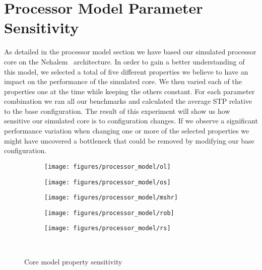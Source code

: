 
\section{Processor Model Parameter Sensitivity}
\label{sec:results:model_sensitivity}

As detailed in the processor model section we have based our simulated processor core on the Nehalem~\cite{Thomadakis2011} architecture.
In order to gain a better understanding of this model, we selected a total of five different properties we believe to have an impact on the performance of the simulated core.
We then varied each of the properties one at the time while keeping the others constant.
For each parameter combination we ran all our benchmarks and calculated the average STP relative to the base configuration.
The result of this experiment will show us how sensitive our simulated core is to configuration changes.
If we observe a significant performance variation when changing one or more of the selected properties we might have uncovered a bottleneck that could be removed by modifying our base configuration.

\begin{figure}[!htb]
        \centering
        \begin{subfigure}[b]{0.5\textwidth}
                \texttt{[image: figures/processor\_model/ol]}
                \label{fig:processor_model:sensitivity:ol}
        \end{subfigure}%
        \begin{subfigure}[b]{0.5\textwidth}
                \texttt{[image: figures/processor\_model/os]}
                \label{fig:processor_model:sensitivity:os}
        \end{subfigure}
        \begin{subfigure}[b]{0.5\textwidth}
                \texttt{[image: figures/processor\_model/mshr]}
                \label{fig:processor_model:sensitivity:mshr}
        \end{subfigure}%
        \begin{subfigure}[b]{0.5\textwidth}
                \texttt{[image: figures/processor\_model/rob]}
                \label{fig:processor_model:sensitivity:rob}
        \end{subfigure}
        \begin{subfigure}[b]{0.5\textwidth}
                \texttt{[image: figures/processor\_model/rs]}
                \label{fig:processor_model:sensitivity:rs}
        \end{subfigure}%
        \caption{Core model property sensitivity}\label{fig:processor_model:sensitivity}
       ~ %
\end{figure}

